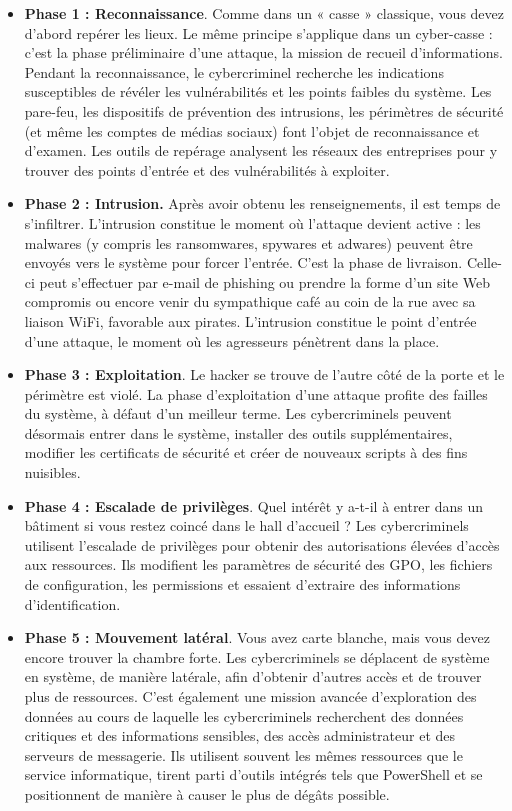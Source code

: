 \begin{itemize}
  \item \textbf{Phase 1 : Reconnaissance}. Comme dans un « casse » classique, vous devez d’abord repérer les lieux. Le même principe s’applique dans un cyber-casse : c’est la phase préliminaire d’une attaque, la mission de recueil d’informations. Pendant la reconnaissance, le cybercriminel recherche les indications susceptibles de révéler les vulnérabilités et les points faibles du système. Les pare-feu, les dispositifs de prévention des intrusions, les périmètres de sécurité (et même les comptes de médias sociaux) font l’objet de reconnaissance et d’examen. Les outils de repérage analysent les réseaux des entreprises pour y trouver des points d’entrée et des vulnérabilités à exploiter.

 \item \textbf{Phase 2 : Intrusion.} Après avoir obtenu les renseignements, il est temps de s’infiltrer. L’intrusion constitue le moment où l’attaque devient active : les malwares (y compris les ransomwares, spywares et adwares) peuvent être envoyés vers le système pour forcer l’entrée. C’est la phase de livraison. Celle-ci peut s’effectuer par e-mail de phishing ou prendre la forme d’un site Web compromis ou encore venir du sympathique café au coin de la rue avec sa liaison WiFi, favorable aux pirates. L’intrusion constitue le point d’entrée d’une attaque, le moment où les agresseurs pénètrent dans la place.

 \item \textbf{Phase 3 : Exploitation}. Le hacker se trouve de l’autre côté de la porte et le périmètre est violé. La phase d’exploitation d’une attaque profite des failles du système, à défaut d’un meilleur terme. Les cybercriminels peuvent désormais entrer dans le système, installer des outils supplémentaires, modifier les certificats de sécurité et créer de nouveaux scripts à des fins nuisibles.

 \item \textbf{Phase 4 : Escalade de privilèges}. Quel intérêt y a-t-il à entrer dans un bâtiment si vous restez coincé dans le hall d’accueil ? Les cybercriminels utilisent l’escalade de privilèges pour obtenir des autorisations élevées d’accès aux ressources. Ils modifient les paramètres de sécurité des GPO, les fichiers de configuration, les permissions et essaient d’extraire des informations d’identification.

 \item \textbf{Phase 5 : Mouvement latéral}. Vous avez carte blanche, mais vous devez encore trouver la chambre forte. Les cybercriminels se déplacent de système en système, de manière latérale, afin d’obtenir d’autres accès et de trouver plus de ressources. C’est également une mission avancée d’exploration des données au cours de laquelle les cybercriminels recherchent des données critiques et des informations sensibles, des accès administrateur et des serveurs de messagerie. Ils utilisent souvent les mêmes ressources que le service informatique, tirent parti d’outils intégrés tels que PowerShell et se positionnent de manière à causer le plus de dégâts possible.


\end{itemize}
